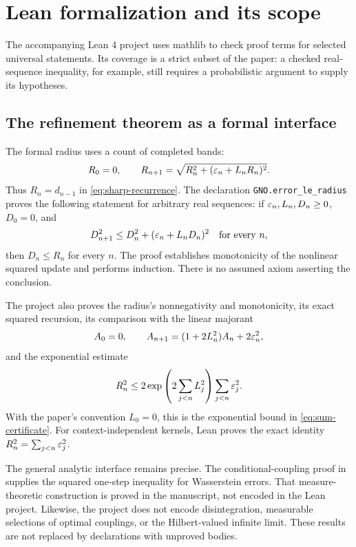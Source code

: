 \section{Lean formalization and its scope}\label{sec:lean}
The accompanying Lean 4 project uses mathlib
\citep{demoura2021,mathlib2020} to check proof terms for selected universal statements. Its coverage is a strict subset of the paper: a checked real-sequence inequality, for example, still requires a probabilistic argument to supply its hypotheses.

\subsection{The refinement theorem as a formal interface}
The formal radius uses a count of completed bands:
\[
 R_0=0,\qquad
 R_{n+1}=\sqrt{R_n^2+(\varepsilon_n+L_nR_n)^2}.
\]
Thus $R_n=d_{n-1}$ in \eqref{eq:sharp-recurrence}. The declaration
\texttt{GNO.error\_le\_radius} proves the following statement for arbitrary real sequences:
if $\varepsilon_n,L_n,D_n\ge0$, $D_0=0$, and
\[
 D_{n+1}^2\le D_n^2+(\varepsilon_n+L_nD_n)^2
 \quad\hbox{for every }n,
\]
then $D_n\le R_n$ for every $n$.
The proof establishes monotonicity of the nonlinear squared update and performs induction. There is no assumed axiom asserting the conclusion.

The project also proves the radius's nonnegativity and monotonicity, its exact squared recursion, its comparison with the linear majorant
\[
 A_0=0,\qquad
 A_{n+1}=(1+2L_n^2)A_n+2\varepsilon_n^2,
\]
and the exponential estimate
\begin{equation}\label{eq:lean-exponential}
 R_n^2\le
 2\exp\left(2\sum_{j<n}L_j^2\right)\sum_{j<n}\varepsilon_j^2.
\end{equation}
With the paper's convention $L_0=0$, this is the exponential bound in
\eqref{eq:sum-certificate}. For context-independent kernels, Lean proves the exact identity
$R_n^2=\sum_{j<n}\varepsilon_j^2$.

The general analytic interface remains precise. The conditional-coupling proof in
 supplies the squared one-step inequality for Wasserstein errors. That measure-theoretic construction is proved in the manuscript, not encoded in the Lean project. Likewise, the project does not encode disintegration, measurable selections of optimal couplings, or the Hilbert-valued infinite limit. These results are not replaced by declarations with unproved bodies.

